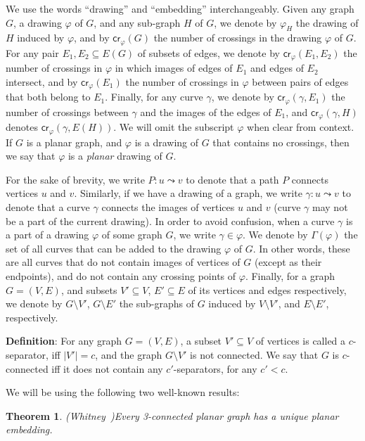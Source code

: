 \documentclass[twoside,leqno,twocolumn]{article}
\newcommand{\connect}{\leadsto}
\newcommand{\sse}{\subseteq}
\newtheorem{theorem}{Theorem}
\newenvironment{Definition}{{\bf Definition}: }{}
\renewcommand{\phi}{\varphi}
\newcommand{\cro}{\mathsf{cr}}
\begin{document}
We use the words ``drawing'' and ``embedding'' interchangeably. 
Given any graph $G$, a drawing $\phi$ of $G$, and any sub-graph $H$ of $G$, we denote by $\phi_H$ the drawing of $H$ induced by $\phi$, and by $\cro_{\phi}(G)$ the number of crossings in the drawing $\phi$ of $G$. For any pair $E_1,E_2\sse E(G)$ of subsets of edges, we denote by $\cro_{\phi}(E_1,E_2)$ the number of crossings in $\phi$ in which images of edges of $E_1$ and edges of $E_2$ intersect, and by $\cro_{\phi}(E_1)$ the number of crossings in $\phi$ between pairs of edges that both belong to $E_1$. Finally, for any curve $\gamma$, we denote by $\cro_{\phi}(\gamma,E_1)$ the number of crossings between $\gamma$ and the images of the edges of $E_1$, and $\cro_{\phi}(\gamma,H)$ denotes $\cro_{\phi}(\gamma,E(H))$. We will omit the subscript $\phi$ when clear from context.
If $G$ is a planar graph, and $\phi$ is a drawing of $G$ that contains no crossings, then we say that $\phi$ is a \emph{planar} drawing of $G$.


For the sake of brevity, we write $P: u\connect v$ to denote that a path $P$ connects vertices $u$ and $v$. Similarly, if we have a drawing of a graph, we write $\gamma:u\connect v$ to denote that a curve $\gamma$ connects the images of vertices $u$ and $v$ (curve $\gamma$ may not be a part of the current drawing). 
In order to avoid confusion, when a curve $\gamma$ is a part of a drawing $\phi$ of some graph $G$, we write $\gamma\in \phi$. We denote by $\Gamma(\phi)$ the set of all curves that can be added to the drawing $\phi$ of $G$. In other words, these are all curves that do not contain images of vertices of $G$ (except as their endpoints), and do not contain any crossing points of $\phi$.
Finally, for a graph $G=(V,E)$, and subsets $V'\sse V$, $E'\sse E$ of its vertices and edges respectively, we denote by $G\setminus V'$, $G\setminus E'$ the sub-graphs of $G$ induced by $V\setminus V'$, and $E\setminus E'$, respectively.

\begin{Definition} For any graph $G=(V,E)$, a subset $V'\sse V$ of vertices is called a $c$-separator, iff $|V'|=c$, and the graph $G\setminus V'$ is not connected. We say that $G$ is $c$-connected iff it does not contain any $c'$-separators, for any $c'<c$.
 \end{Definition}
 
We will be using the following two well-known results:

\begin{theorem} (Whitney~\cite{Whitney})\label{thm:Whitney} Every 3-connected planar graph has a unique planar embedding.
\end{theorem}
\end{document}
